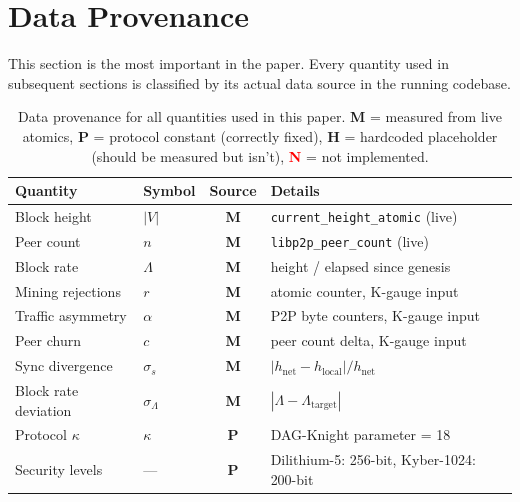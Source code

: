 \documentclass[11pt,a4paper,twocolumn]{article}
\begin{document}
\section{Data Provenance}

\begin{honestybox}
This section is the most important in the paper. Every quantity used in subsequent sections is classified by its actual data source in the running codebase.
\end{honestybox}

\begin{table}[t]
\centering
\caption{Data provenance for all quantities used in this paper. \textcolor{measured}{\textbf{M}} = measured from live atomics, \textcolor{sectionblue}{\textbf{P}} = protocol constant (correctly fixed), \textcolor{hardcoded}{\textbf{H}} = hardcoded placeholder (should be measured but isn't), \textcolor{red}{\textbf{N}} = not implemented.}
\label{tab:provenance}
\small
\begin{tabular}{@{}llcl@{}}
\toprule
\textbf{Quantity} & \textbf{Symbol} & \textbf{Source} & \textbf{Details} \\
\midrule
Block height         & $|V|$      & \textcolor{measured}{\textbf{M}} & \texttt{current\_height\_atomic} (live) \\
Peer count           & $n$        & \textcolor{measured}{\textbf{M}} & \texttt{libp2p\_peer\_count} (live) \\
Block rate           & $\Lambda$  & \textcolor{measured}{\textbf{M}} & height / elapsed since genesis \\
Mining rejections    & $r$        & \textcolor{measured}{\textbf{M}} & atomic counter, K-gauge input \\
Traffic asymmetry    & $\alpha$   & \textcolor{measured}{\textbf{M}} & P2P byte counters, K-gauge input \\
Peer churn           & $c$        & \textcolor{measured}{\textbf{M}} & peer count delta, K-gauge input \\
Sync divergence      & $\sigma_s$ & \textcolor{measured}{\textbf{M}} & $|h_{\text{net}} - h_{\text{local}}| / h_{\text{net}}$ \\
Block rate deviation & $\sigma_\Lambda$ & \textcolor{measured}{\textbf{M}} & $|\Lambda - \Lambda_{\text{target}}|$ \\
\midrule
Protocol $\kappa$    & $\kappa$   & \textcolor{sectionblue}{\textbf{P}} & DAG-Knight parameter = 18 \\
Security levels      & ---        & \textcolor{sectionblue}{\textbf{P}} & Dilithium-5: 256-bit, Kyber-1024: 200-bit \\

\end{tabular}
\end{table}
\end{document}
